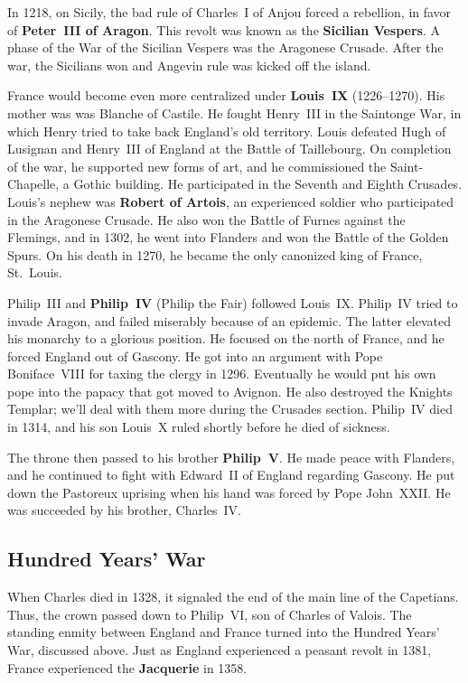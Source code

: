 In 1218, on Sicily, the bad rule of Charles~I of Anjou forced a rebellion,
in favor of \textbf{Peter~III of Aragon}.
This revolt was known as the \textbf{Sicilian Vespers}.
A phase of the War of the Sicilian Vespers was the Aragonese Crusade.
After the war, the Sicilians won and Angevin rule was kicked off the island.

France would become even more centralized under \textbf{Louis~IX} (1226--1270).
His mother was was Blanche of Castile.
He fought Henry~III in the Saintonge War, in which Henry tried to take back England's old territory.
Louis defeated Hugh of Lusignan and Henry~III of England at the Battle of Taillebourg.
On completion of the war, he supported new forms of art,
and he commissioned the Saint-Chapelle, a Gothic building.
He participated in the Seventh and Eighth Crusades.
Louis's nephew was \textbf{Robert of Artois},
an experienced soldier who participated in the Aragonese Crusade.
He also won the Battle of Furnes against the Flemings,
and in 1302, he went into Flanders and won the Battle of the Golden Spurs.
On his death in 1270, he became the only canonized king of France, St.\ Louis.

Philip~III and \textbf{Philip~IV} (Philip the Fair) followed Louis~IX\@.
Philip~IV tried to invade Aragon, and failed miserably because of an epidemic.
The latter elevated his monarchy to a glorious position.
He focused on the north of France, and he forced England out of Gascony.
He got into an argument with Pope Boniface~VIII for taxing the clergy in 1296.
Eventually he would put his own pope into the papacy that got moved to Avignon.
He also destroyed the Knights Templar; we'll deal with them more during the Crusades section.
Philip~IV died in 1314, and his son Louis~X ruled shortly before he died of sickness.

The throne then passed to his brother \textbf{Philip~V}.
He made peace with Flanders, and he continued to fight with Edward~II of England regarding Gascony.
He put down the Pastoreux uprising when his hand was forced by Pope John~XXII\@.
He was succeeded by his brother, Charles~IV\@.

\subsection*{Hundred Years' War}

When Charles died in 1328, it signaled the end of the main line of the Capetians.
Thus, the crown passed down to Philip~VI, son of Charles of Valois.
The standing enmity between England and France turned into the Hundred Years' War, discussed above.
Just as England experienced a peasant revolt in 1381,
France experienced the \textbf{Jacquerie} in 1358.

